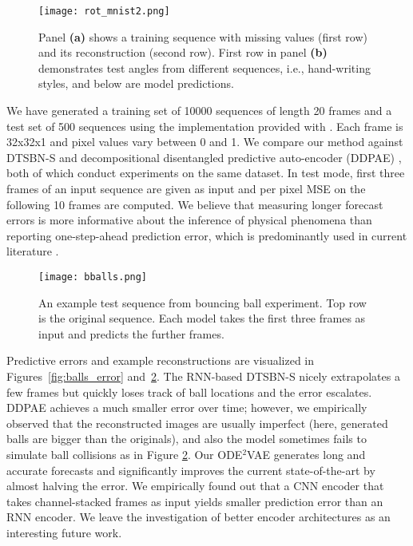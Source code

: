 \documentclass{article}
\newcommand{\0}{\mathbf{0}}
\begin{document}
\begin{figure}
\centering
\texttt{[image: rot\_mnist2.png]}
  \caption{Panel \textbf{(a)} shows a training sequence with missing values (first row) and its reconstruction (second row). First row in panel \textbf{(b)} demonstrates test angles from different sequences, i.e., hand-writing styles, and below are model predictions.}
  \label{fig:mnist}
\end{figure}

We have generated a training set of 10000 sequences of length 20 frames and a test set of 500 sequences using the implementation provided with \cite{sutskever2009recurrent}. Each frame is 32x32x1 and pixel values vary between 0 and 1. We compare our method against DTSBN-S \citep{gan2015deep} and decompositional disentangled predictive auto-encoder (DDPAE) \citep{hsieh2018learning}, both of which conduct experiments on the same dataset. In test mode, first three frames of an input sequence are given as input and per pixel MSE on the following 10 frames are computed. We believe that measuring longer forecast errors is more informative about the inference of physical phenomena than reporting one-step-ahead prediction error, which is predominantly used in current literature \citep{gan2015deep,lotter2015unsupervised}.


\begin{figure}[b]
\centering
\texttt{[image: bballs.png]}
  \caption{An example test sequence from bouncing ball experiment. Top row is the original sequence. Each model takes the first three frames as input and predicts the further frames.}
  \label{fig:balls}
\end{figure}

Predictive errors and example reconstructions are visualized in Figures~\ref{fig:balls_error} and~\ref{fig:balls}. The RNN-based DTSBN-S nicely extrapolates a few frames but quickly loses track of ball locations and the error escalates. DDPAE achieves a much smaller error over time; however, we empirically observed that the reconstructed images are usually imperfect (here, generated balls are bigger than the originals), and also the model sometimes fails to simulate ball collisions as in Figure \ref{fig:balls}. Our ODE$^2$VAE generates long and accurate forecasts and significantly improves the current state-of-the-art by almost halving the error. We empirically found out that a CNN encoder that takes channel-stacked frames as input yields smaller prediction error than an RNN encoder. We leave the investigation of better encoder architectures as an interesting future work.
\end{document}
